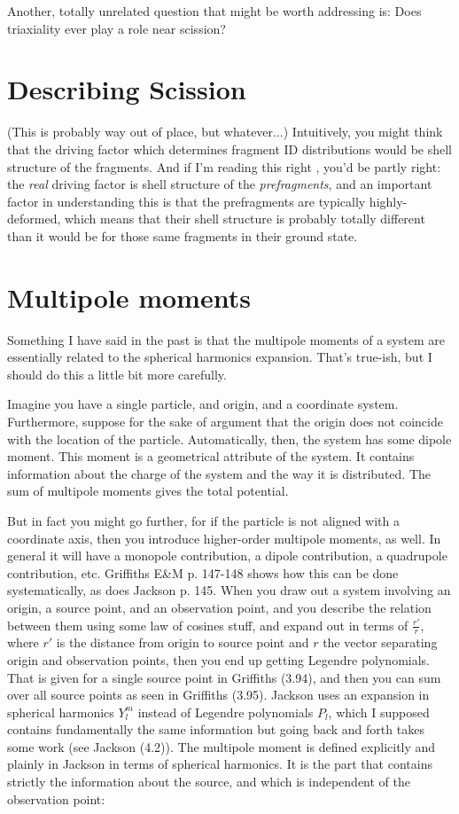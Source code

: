 Another, totally unrelated question that might be worth addressing is: Does triaxiality ever play a role near scission?

\section{Describing Scission}

(This is probably way out of place, but whatever...) Intuitively, you might think that the driving factor which determines fragment ID distributions would be shell structure of the fragments. And if I'm reading this right \cite[2nd paragraph + references]{Mcdonnell2014}, you'd be partly right: the \textit{real} driving factor is shell structure of the \textit{prefragments}, and an important factor in understanding this is that the prefragments are typically highly-deformed, which means that their shell structure is probably totally different than it would be for those same fragments in their ground state.

\section{Multipole moments}
Something I have said in the past is that the multipole moments of a system are essentially related to the spherical harmonics expansion. That's true-ish, but I should do this a little bit more carefully.

Imagine you have a single particle, and origin, and a coordinate system. Furthermore, suppose for the sake of argument that the origin does not coincide with the location of the particle. Automatically, then, the system has some dipole moment. This moment is a geometrical attribute of the system. It contains information about the charge of the system and the way it is distributed. The sum of multipole moments gives the total potential.

But in fact you might go further, for if the particle is not aligned with a coordinate axis, then you introduce higher-order multipole moments, as well. In general it will have a monopole contribution, a dipole contribution, a quadrupole contribution, etc. Griffiths E\&M p. 147-148 shows how this can be done systematically, as does Jackson p. 145. When you draw out a system involving an origin, a source point, and an observation point, and you describe the relation between them using some law of cosines stuff, and expand out in terms of $\frac{r'}{r}$, where $r'$ is the distance from origin to source point and $r$ the vector separating origin and observation points, then you end up getting Legendre polynomials. That is given for a single source point in Griffiths (3.94), and then you can sum over all source points as seen in Griffiths (3.95). Jackson uses an expansion in spherical harmonics $Y^m_l$ instead of Legendre polynomials $P_l$, which I supposed contains fundamentally the same information but going back and forth takes some work (see Jackson (4.2)). The multipole moment is defined explicitly and plainly in Jackson in terms of spherical harmonics. It is the part that contains strictly the information about the source, and which is independent of the observation point:


